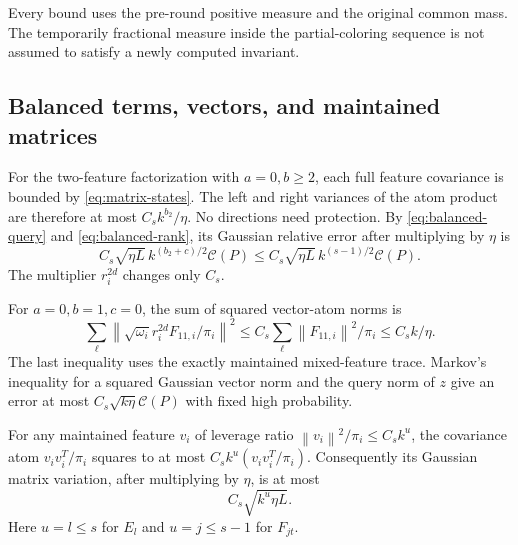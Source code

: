 \documentclass[11pt]{article}
\theoremstyle{remark}\newtheorem{remark}[theorem]{Remark}
\newcommand{\norm}[1]{\left\|#1\right\|}\newcommand{\ip}[2]{\left\langle #1,#2\right\rangle}
\newcommand{\cost}{\mathcal C}\newcommand{\OPT}{\mathsf{OPT}}
\begin{document}
Every bound uses the pre-round positive measure and the original common mass. The temporarily fractional measure inside the partial-coloring sequence is not assumed to satisfy a newly computed invariant.

\subsection{Balanced terms, vectors, and maintained matrices}
For the two-feature factorization with $a=0,b\ge2$, each full feature covariance is bounded by \eqref{eq:matrix-states}. The left and right variances of the atom product are therefore at most $C_s k^{b_2}/\eta$. No directions need protection. By \eqref{eq:balanced-query} and \eqref{eq:balanced-rank}, its Gaussian relative error after multiplying by $\eta$ is
\begin{equation}\label{eq:balanced-error}
 C_s\sqrt{\eta L}\,k^{(b_2+c)/2}\cost(P)
 \le C_s\sqrt{\eta L}\,k^{(s-1)/2}\cost(P).
\end{equation}
The multiplier $r_i^{2d}$ changes only $C_s$.

For $a=0,b=1,c=0$, the sum of squared vector-atom norms is
\[
 \sum_\ell\norm{\sqrt{\omega_i}r_i^{2d}F_{11,i}/\pi_i}^2
 \le C_s\sum_\ell\norm{F_{11,i}}^2/\pi_i\le C_s k/\eta.
\]
The last inequality uses the exactly maintained mixed-feature trace. Markov's inequality for a squared Gaussian vector norm and the query norm of $z$ give an error at most $C_s\sqrt{k\eta}\cost(P)$ with fixed high probability.

For any maintained feature $v_i$ of leverage ratio $\norm{v_i}^2/\pi_i\le C_s k^u$, the covariance atom $v_iv_i^T/\pi_i$ squares to at most $C_s k^u(v_iv_i^T/\pi_i)$. Consequently its Gaussian matrix variation, after multiplying by $\eta$, is at most
\begin{equation}\label{eq:state-drift}
 C_s\sqrt{k^u\eta L}.
\end{equation}
Here $u=l\le s$ for $E_l$ and $u=j\le s-1$ for $F_{jt}$.
\end{document}
